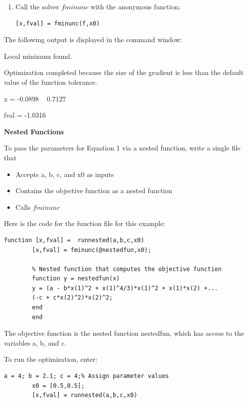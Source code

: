 \documentclass[10pt,math=newtx,citestyle=gb7714-2015,bibstyle=gb7714-2015]{elegantbook}
\begin{document}
{{{\begin{enumerate}
		\item Call the solver $fminunc$ with the anonymous function:
		\begin{lstlisting}[frame=shadowbox]
			[x,fval] = fminunc(f,x0)
		\end{lstlisting}
	\end{enumerate}
	
	The following output is displayed in the command window:
	
	Local minimum found.
	
	Optimization completed because the size of the gradient is less than the default value of the function tolerance.
	
	x =
	-0.0898  ~  0.7127
	
	fval =
	-1.0316
	
	\textbf{Nested Functions}   
	
	To pass the parameters for Equation 1 via a nested function, write a single file that
	
	\begin{itemize}
		\item Accepts a, b, c, and x0 as inputs
		
		\item Contains the objective function as a nested function
		
		\item Calls $fminunc$
	\end{itemize}
	
	Here is the code for the function file for this example:
	
	
	\begin{lstlisting}[frame=shadowbox]
		function [x,fval] =  runnested(a,b,c,x0)
		[x,fval] = fminunc(@nestedfun,x0);
		
		% Nested function that computes the objective function
		function y = nestedfun(x)
		y = (a - b*x(1)^2 + x(1)^4/3)*x(1)^2 + x(1)*x(2) +...
		(-c + c*x(2)^2)*x(2)^2;
		end
		end
	\end{lstlisting}
	
	The objective function is the nested function nestedfun, which has access to the variables a, b, and c.
	
	To run the optimization, enter:
	
	\begin{lstlisting}[frame=shadowbox]
		a = 4; b = 2.1; c = 4;% Assign parameter values
		x0 = [0.5,0.5];
		[x,fval] = runnested(a,b,c,x0)
		
	\end{lstlisting}
	
}}}
\end{document}
